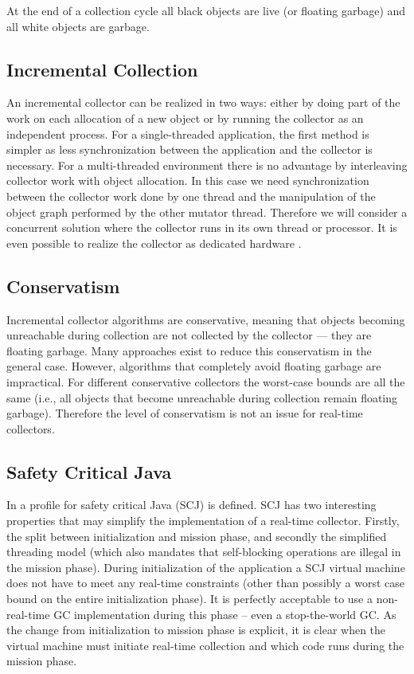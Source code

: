 At the end of a collection cycle all black objects are live (or
floating garbage) and all white objects are garbage.

\subsection{Incremental Collection}

An incremental collector can be realized in two ways: either by doing
part of the work on each allocation of a new object or by running the
collector as an independent process. For a single-threaded
application, the first method is simpler as less synchronization
between the application and the collector is necessary. For a
multi-threaded environment there is no advantage by interleaving
collector work with object allocation. In this case we need
synchronization between the collector work done by one thread and the
manipulation of the object graph performed by the other mutator
thread. Therefore we will consider a concurrent solution where the
collector runs in its own thread or processor. It is even possible to
realize the collector as dedicated hardware \cite{gc:flavius}.

\subsection{Conservatism}

Incremental collector algorithms are conservative, meaning that
objects becoming unreachable during collection are not collected by
the collector --- they are floating garbage. Many approaches exist to
reduce this conservatism in the general case. However, algorithms
that completely avoid floating garbage are impractical. For different
conservative collectors the worst-case bounds are all the same (i.e.,
all objects that become unreachable during collection remain floating
garbage). Therefore the level of conservatism is not an issue for
real-time collectors.

\subsection{Safety Critical Java}

In \cite{jop:scjava} a profile for safety critical Java (SCJ) is
defined. SCJ has two interesting properties that may simplify the
implementation of a real-time collector. Firstly, the split between
initialization and mission phase, and secondly the simplified
threading model (which also mandates that self-blocking operations
are illegal in the mission phase).  During initialization of the
application a SCJ virtual machine does not have to meet any real-time
constraints (other than possibly a worst case bound on the entire
initialization phase). It is perfectly acceptable to use a
non-real-time GC implementation during this phase -- even a
stop-the-world GC. As the change from initialization to mission phase
is explicit, it is clear when the virtual machine must initiate
real-time collection and which code runs during the mission phase.



